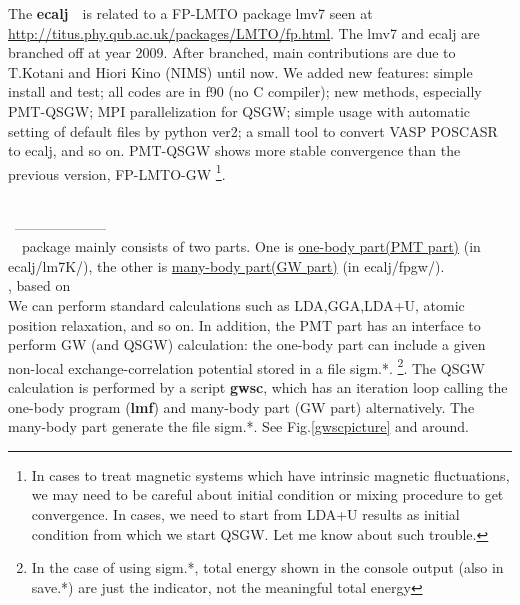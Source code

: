 \documentclass[a4paper,10pt,epsf,fleqn]{article}
\newcommand{\exe}[1]{{\bf #1}}
\newcommand{\io}[1]{{\sf  #1}}
\newcommand{\ecalj}{{\bf ecalj}\ }
\begin{document}
The \ecalj\ is related to a FP-LMTO package lmv7 seen at\\
\url{http://titus.phy.qub.ac.uk/packages/LMTO/fp.html}. 
The lmv7 and ecalj are branched off at year 2009.
After branched, main contributions are 
due to T.Kotani and Hiori Kino (NIMS) until now. 
We added new features: simple install and test;
all codes are in f90 (no C compiler);
new methods, especially PMT-QSGW; MPI parallelization for QSGW;
simple usage with automatic setting of default files by python ver2;
a small tool to convert VASP POSCASR to ecalj, and so on.
PMT-QSGW shows more stable convergence than the previous version, FP-LMTO-GW
\footnote{In cases to treat magnetic
systems which have intrinsic magnetic fluctuations, 
we may need to be careful about initial condition or mixing procedure
to get convergence. In cases, we need to start from LDA+U results as initial
condition from which we start QSGW. Let me know about such trouble.}.

\ \\

\ -------------------- \\
\noindent \ecalj\ package mainly consists of two parts.
One is \underline{one-body part(PMT part)} (in \io{ecalj/lm7K/}), 
the other is \underline{many-body part(GW part)} (in \io{ecalj/fpgw/}).\\


, based on \cite{kotani2015pmt}\\
We can perform standard calculations such
as LDA,GGA,LDA+U, atomic position relaxation, and so on.
In addition, the PMT part has an interface to perform GW (and QSGW) calculation:
the one-body part can include a given non-local
exchange-correlation potential stored in a file \io{sigm.*}.
\footnote{In the case of using \io{sigm.*}, 
total energy shown in the console output 
(also in \io{save.*}) are just the indicator, not the meaningful total energy}.
The QSGW calculation is performed by a script \exe{gwsc}, which
has an iteration loop calling the one-body program (\exe{lmf}) and
many-body part (GW part) alternatively. The many-body part generate
the file \io{sigm.*}. See Fig.\ref{gwscpicture} and around.\\
\end{document}

